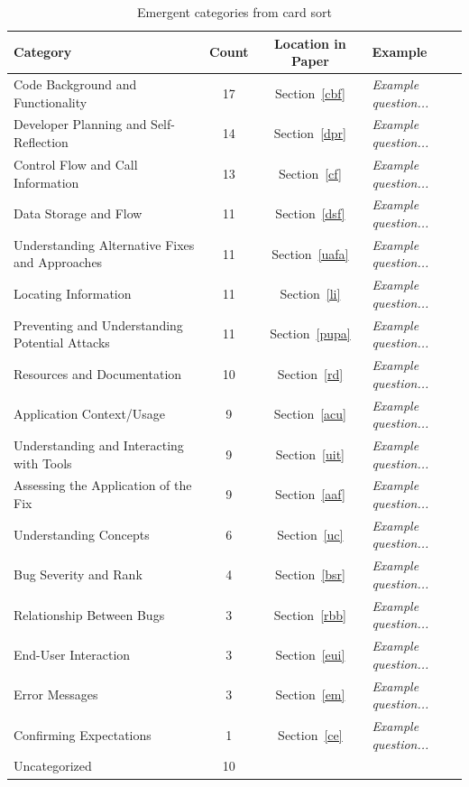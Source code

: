 \documentclass[conference]{IEEEtran}
\begin{document}
\begin{table} 
\centering
\caption{Emergent categories from card sort}
\begin{tabular}{|l|c|c|l|}
\rowcolor{gray!50}
\hline
    Category											& Count		& Location in Paper			& Example 	\\
    \hline		
    Code Background and Functionality	 				& 17     	& Section~\ref{cbf}				& \emph{Example question...}			\\
    \hline
    Developer Planning and Self-Reflection				& 14    	& Section~\ref{dpr}				& \emph{Example question...}			\\
    \hline
    Control Flow and Call Information					& 13     	& Section~\ref{cf}				& \emph{Example question...}		\\
    \hline
    Data Storage and Flow								& 11     	& Section~\ref{dsf}				& \emph{Example question...}		\\
    \hline
    Understanding Alternative Fixes and Approaches		& 11     	& Section~\ref{uafa}			& \emph{Example question...}			\\
    \hline
    Locating Information 								& 11      	& Section~\ref{li}				& \emph{Example question...}			\\
    \hline
    Preventing and Understanding Potential Attacks		& 11     	& Section~\ref{pupa}			& \emph{Example question...}			\\
    \hline
    Resources and Documentation							& 10     	& Section~\ref{rd}				& \emph{Example question...}			\\
    \hline    
    Application Context/Usage							& 9     	& Section~\ref{acu}				& \emph{Example question...}			\\
    \hline
    Understanding and Interacting with Tools			& 9     	& Section~\ref{uit}				& \emph{Example question...}			\\
    \hline
    Assessing the Application of the Fix				& 9     	& Section~\ref{aaf}				& \emph{Example question...}			\\
    \hline
    Understanding Concepts								& 6 		& Section~\ref{uc}				& \emph{Example question...}				\\
    \hline
    Bug Severity and Rank								& 4     	& Section~\ref{bsr}				& \emph{Example question...}			\\
    \hline
    Relationship Between Bugs							& 3     	& Section~\ref{rbb}				& \emph{Example question...}			\\
    \hline
    End-User Interaction								& 3     	& Section~\ref{eui}				& \emph{Example question...}		\\
    \hline
    Error Messages										& 3     	& Section~\ref{em}				& \emph{Example question...}			\\
    \hline
    Confirming Expectations					 			& 1			& Section~\ref{ce}				& \emph{Example question...}   \\
    \hline
    Uncategorized										& 10    	&						& \emph{} \\
    \hline
\end{tabular}
\label{table:categories}
\end{table}
\end{document}
